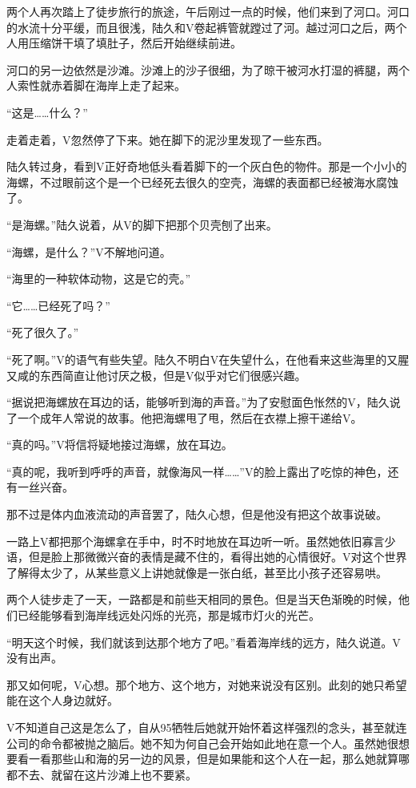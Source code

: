 两个人再次踏上了徒步旅行的旅途，午后刚过一点的时候，他们来到了河口。河口的水流十分平缓，而且很浅，陆久和V卷起裤管就蹚过了河。越过河口之后，两个人用压缩饼干填了填肚子，然后开始继续前进。

河口的另一边依然是沙滩。沙滩上的沙子很细，为了晾干被河水打湿的裤腿，两个人索性就赤着脚在海岸上走了起来。

“这是……什么？”

走着走着，V忽然停了下来。她在脚下的泥沙里发现了一些东西。

陆久转过身，看到V正好奇地低头看着脚下的一个灰白色的物件。那是一个小小的海螺，不过眼前这个是一个已经死去很久的空壳，海螺的表面都已经被海水腐蚀了。

“是海螺。”陆久说着，从V的脚下把那个贝壳刨了出来。

“海螺，是什么？”V不解地问道。

“海里的一种软体动物，这是它的壳。”

“它……已经死了吗？”

“死了很久了。”

“死了啊。”V的语气有些失望。陆久不明白V在失望什么，在他看来这些海里的又腥又咸的东西简直让他讨厌之极，但是V似乎对它们很感兴趣。

“据说把海螺放在耳边的话，能够听到海的声音。”为了安慰面色怅然的V，陆久说了一个成年人常说的故事。他把海螺甩了甩，然后在衣襟上擦干递给V。

“真的吗。”V将信将疑地接过海螺，放在耳边。

“真的呢，我听到呼呼的声音，就像海风一样……”V的脸上露出了吃惊的神色，还有一丝兴奋。

那不过是体内血液流动的声音罢了，陆久心想，但是他没有把这个故事说破。

一路上V都把那个海螺拿在手中，时不时地放在耳边听一听。虽然她依旧寡言少语，但是脸上那微微兴奋的表情是藏不住的，看得出她的心情很好。V对这个世界了解得太少了，从某些意义上讲她就像是一张白纸，甚至比小孩子还容易哄。

两个人徒步走了一天，一路都是和前些天相同的景色。但是当天色渐晚的时候，他们已经能够看到海岸线远处闪烁的光亮，那是城市灯火的光芒。

“明天这个时候，我们就该到达那个地方了吧。”看着海岸线的远方，陆久说道。V没有出声。

那又如何呢，V心想。那个地方、这个地方，对她来说没有区别。此刻的她只希望能在这个人身边就好。

V不知道自己这是怎么了，自从95牺牲后她就开始怀着这样强烈的念头，甚至就连公司的命令都被抛之脑后。她不知为何自己会开始如此地在意一个人。虽然她很想要看一看那些山和海的另一边的风景，但是如果能和这个人在一起，那么她就算哪都不去、就留在这片沙滩上也不要紧。

